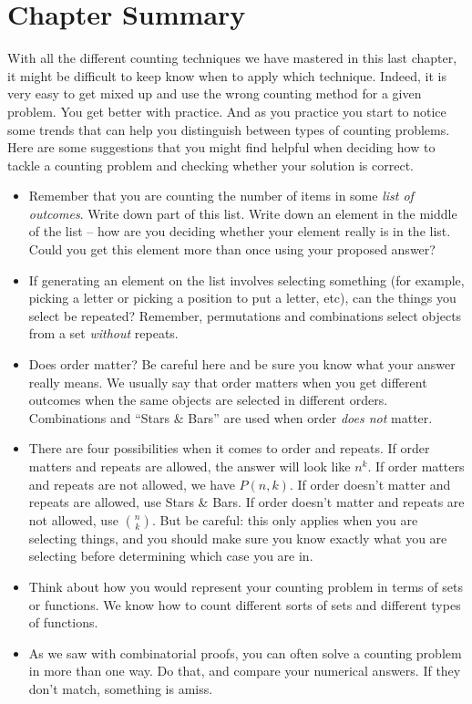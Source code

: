 \documentclass[12pt]{article}
\begin{document}
\section{Chapter Summary}

With all the different counting techniques we have mastered in this last chapter, it might be difficult to keep know when to apply which technique.  Indeed, it is very easy to get mixed up and use the wrong counting method for a given problem.  You get better with practice.  And as you practice you start to notice some trends that can help you distinguish between types of counting problems.  Here are some suggestions that you might find helpful when deciding how to tackle a counting problem and checking whether your solution is correct.

\begin{itemize}
\item Remember that you are counting the number of items in some \emph{list of outcomes}.  Write down part of this list.  Write down an element in the middle of the list -- how are you deciding whether your element really is in the list.  Could you get this element more than once using your proposed answer?
\item If generating an element on the list involves selecting something (for example, picking a letter or picking a position to put a letter, etc), can the things you select be repeated?  Remember, permutations and combinations select objects from a set \emph{without} repeats.
\item Does order matter?  Be careful here and be sure you know what your answer really means.  We usually say that order matters when you get different outcomes when the same objects are selected in different orders.  Combinations and ``Stars \& Bars'' are used when order {\em does not} matter.
\item There are four possibilities when it comes to order and repeats.  If order matters and repeats are allowed, the answer will look like $n^k$.  If order matters and repeats are not allowed, we have $P(n,k)$.  If order doesn't matter and repeats are allowed, use Stars \& Bars.  If order doesn't matter and repeats are not allowed, use ${n\choose k}$.  But be careful: this only applies when you are selecting things, and you should make sure you know exactly what you are selecting before determining which case you are in.
\item Think about how you would represent your counting problem in terms of sets or functions.  We know how to count different sorts of sets and different types of functions.  %

\item As we saw with combinatorial proofs, you can often solve a counting problem in more than one way.  Do that, and compare your numerical answers.  If they don't match, something is amiss.
\end{itemize}
\end{document}
